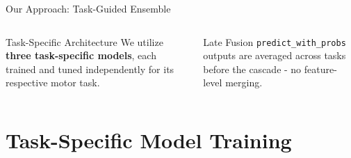 \documentclass[aspectratio=169, 11pt]{beamer}
\begin{document}
\begin{frame}{Our Approach: Task-Guided Ensemble}
\begin{center}
  \end{center}

  \vspace{0.2em}
  \begin{columns}[T]
      \begin{block}{Task-Specific Architecture}
        \small We utilize \textbf{three task-specific
        models}, each trained and tuned independently
        for its respective motor task.
      \end{block}
      \begin{block}{Late Fusion}
        \small \texttt{predict\_with\_probs} outputs are averaged across tasks
        before the cascade - no feature-level merging.
      \end{block}
  \end{columns}
\end{frame}

\section{Task-Specific Model Training}
\end{document}
